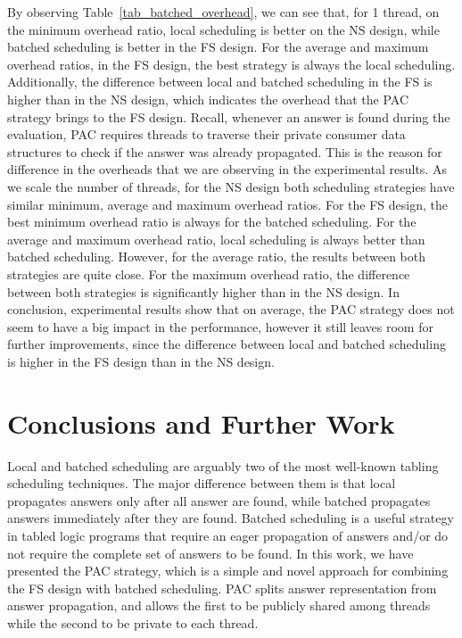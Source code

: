 \documentclass{llncs}
\begin{document}
By observing Table~\ref{tab_batched_overhead}, we can see that, for 1
thread, on the minimum overhead ratio, local scheduling is better on
the NS design, while batched scheduling is better in the FS
design. For the average and maximum overhead ratios, in the FS design,
the best strategy is always the local scheduling. Additionally, the
difference between local and batched scheduling in the FS is higher
than in the NS design, which indicates the overhead that the PAC
strategy brings to the FS design. Recall, whenever an answer is found
during the evaluation, PAC requires threads to traverse their private
consumer data structures to check if the answer was already
propagated. This is the reason for difference in the overheads that we
are observing in the experimental results. As we scale the number of
threads, for the NS design both scheduling strategies have similar
minimum, average and maximum overhead ratios. For the FS design, the
best minimum overhead ratio is always for the batched scheduling. For
the average and maximum overhead ratio, local scheduling is always
better than batched scheduling. However, for the average ratio, the
results between both strategies are quite close. For the maximum
overhead ratio, the difference between both strategies is
significantly higher than in the NS design. In conclusion,
experimental results show that on average, the PAC strategy does not
seem to have a big impact in the performance, however it still leaves
room for further improvements, since the difference between local and
batched scheduling is higher in the FS design than in the NS design.


\section{Conclusions and Further Work}

Local and batched scheduling are arguably two of the most well-known
tabling scheduling techniques. The major difference between them is
that local propagates answers only after all answer are found, while
batched propagates answers immediately after they are found. Batched
scheduling is a useful strategy in tabled logic programs that require
an eager propagation of answers and/or do not require the complete set
of answers to be found. In this work, we have presented the PAC
strategy, which is a simple and novel approach for combining the FS
design with batched scheduling. PAC splits answer representation from
answer propagation, and allows the first to be publicly shared among
threads while the second to be private to each thread.
\end{document}
